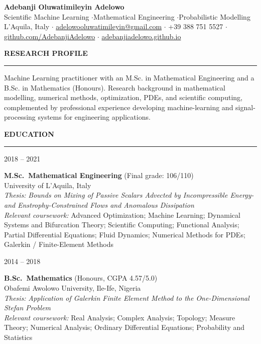 \documentclass[10pt,a4paper]{article}
\newcommand{\cvsec}[1]{%
  \needspace{5\baselineskip}%
  \vspace{3pt}
  {\color{accent}\bfseries\uppercase{#1}}\\[-3pt]
  {\color{accent}\rule{\linewidth}{0.5pt}}%
  \vspace{4pt}%
}
\newcommand{\entry}[2]{%
  \noindent
  \parbox[t]{2.6cm}{\small\raggedright\color{black!60} #1}\hspace{0.3cm}%
  \parbox[t]{13.3cm}{#2}\par\vspace{2pt}
}
\begin{document}
\begin{center}
  {\LARGE\bfseries Adebanji Oluwatimileyin Adelowo}\\[2pt]
  {\small\color{accent} Scientific Machine Learning \enspace$\cdot$\enspace Mathematical Engineering \enspace$\cdot$\enspace Probabilistic Modelling}\\[4pt]
  {\small
  L'Aquila, Italy
  \enspace$\cdot$\enspace
  \href{mailto:adelowooluwatimileyin@gmail.com}{adelowooluwatimileyin@gmail.com}
  \enspace$\cdot$\enspace
  +39 388 751 5527
  \enspace$\cdot$\enspace
  \href{https://github.com/AdebanjiAdelowo}{github.com/AdebanjiAdelowo}
  \enspace$\cdot$\enspace
  \href{https://adebanjiadelowo.github.io}{adebanjiadelowo.github.io}
  }
\end{center}

\vspace{2pt}

\cvsec{Research Profile}

\noindent Machine Learning practitioner with an M.Sc. in Mathematical Engineering and a B.Sc. in Mathematics (Honours). Research background in mathematical modelling, numerical methods, optimization, PDEs, and scientific computing, complemented by professional experience developing machine-learning and signal-processing systems for engineering applications.

\cvsec{Education}

\entry{2018 -- 2021}{%
  \textbf{M.Sc.\ Mathematical Engineering} (Final grade: 106/110)\\
  University of L'Aquila, Italy\\
  \textit{Thesis:} \textit{Bounds on Mixing of Passive Scalars Advected by Incompressible
  Energy- and Enstrophy-Constrained Flows and Anomalous Dissipation}\\
  \textit{Relevant coursework:} Advanced Optimization; Machine Learning; Dynamical Systems and Bifurcation Theory; Scientific Computing; Functional Analysis; Partial Differential Equations; Fluid Dynamics; Numerical Methods for PDEs; Galerkin / Finite-Element Methods
}

\entry{2014 -- 2018}{%
  \textbf{B.Sc.\ Mathematics} (Honours, CGPA 4.57/5.0)\\
  Obafemi Awolowo University, Ile-Ife, Nigeria\\
  \textit{Thesis:} \textit{Application of Galerkin Finite Element Method to the One-Dimensional Stefan Problem}\\
  \textit{Relevant coursework:} Real Analysis; Complex Analysis; Topology; Measure Theory; Numerical Analysis; Ordinary Differential Equations; Probability and Statistics
}
\end{document}
